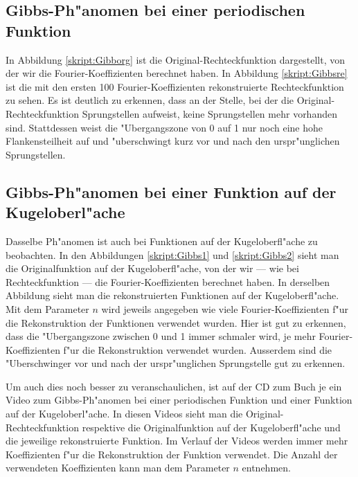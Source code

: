\begin{refsection}
\subsection{Gibbs-Ph"anomen bei einer periodischen Funktion}
In Abbildung \ref{skript:Gibborg} ist die Original-Rechteckfunktion 
dargestellt, von der wir die Fourier-Koeffizienten berechnet haben. 
In Abbildung \ref{skript:Gibbsre} ist die mit den ersten 100 
Fourier-Koeffizienten rekonstruierte Rechteckfunktion zu sehen. 
Es ist deutlich zu erkennen, dass an der Stelle, bei der die 
Original-Rechteckfunktion Sprungstellen aufweist, keine Sprungstellen 
mehr vorhanden sind. 
Stattdessen weist die "Ubergangszone von 0 auf 1 nur noch eine hohe 
Flankensteilheit auf und "uberschwingt kurz vor und nach den 
urspr"unglichen Sprungstellen.

\subsection{Gibbs-Ph"anomen bei einer Funktion auf der Kugeloberl"ache}
Dasselbe Ph"anomen ist auch bei Funktionen auf der Kugeloberfl"ache 
zu beobachten. 
In den Abbildungen \ref{skript:Gibbs1} und \ref{skript:Gibbs2} sieht 
man die Originalfunktion auf der Kugeloberfl"ache, von der wir --- 
wie bei Rechteckfunktion --- die Fourier-Koeffizienten berechnet haben. 
In derselben Abbildung sieht man die rekonstruierten Funktionen auf 
der Kugeloberfl"ache. 
Mit dem Parameter $n$ wird jeweils angegeben wie viele 
Fourier-Koeffizienten f"ur die Rekonstruktion der Funktionen 
verwendet wurden. 
Hier ist gut zu erkennen, dass die "Ubergangszone zwischen 0 und 1 
immer schmaler wird, je mehr Fourier-Koeffizienten f"ur die 
Rekonstruktion verwendet wurden. 
Ausserdem sind die "Uberschwinger vor und nach der urspr"unglichen 
Sprungstelle gut zu erkennen.

Um auch dies noch besser zu veranschaulichen, ist auf der CD zum Buch 
je ein Video zum Gibbs-Ph"anomen bei einer periodischen Funktion und 
einer Funktion auf der Kugeloberl"ache.
In diesen Videos sieht man die Original-Rechteckfunktion respektive
die Originalfunktion auf der Kugeloberfl"ache und die jeweilige
rekonstruierte Funktion. 
Im Verlauf der Videos werden immer mehr Koeffizienten f"ur die 
Rekonstruktion der Funktion verwendet.
Die Anzahl der verwendeten Koeffizienten kann man dem Parameter $n$
entnehmen.


\end{refsection}
